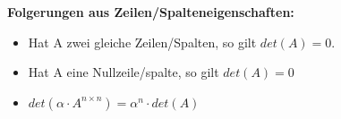 {\vskip2pt

\textbf{Folgerungen aus Zeilen/Spalteneigenschaften:}
\vskip2pt
\begin{itemize}[leftmargin=0.29cm, itemsep=0.5pt]
\item Hat A zwei gleiche Zeilen/Spalten, so gilt $det(A) = 0$.
\item Hat A eine Nullzeile/spalte, so gilt $det(A) = 0$
\item $det(\alpha \cdot A^{n \times n}) = \alpha^n \cdot det(A)$
\end{itemize}

}
\WhiteSpace